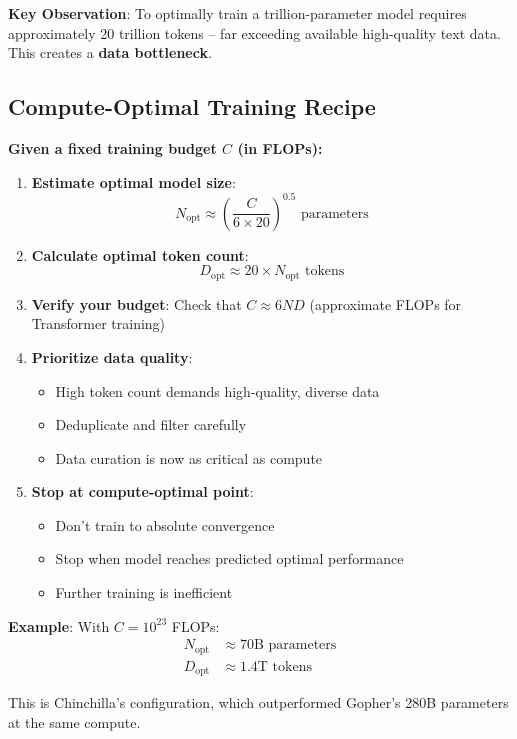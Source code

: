 \documentclass{article}
\begin{document}
\textbf{Key Observation}: To optimally train a trillion-parameter model requires approximately 20 trillion tokens -- far exceeding available high-quality text data. This creates a \textbf{data bottleneck}.

\subsection{Compute-Optimal Training Recipe}

\begin{tcolorbox}[colback=green!5!white, colframe=green!50!black, title=Practical Recipe for Compute-Optimal Training]
\textbf{Given a fixed training budget $C$ (in FLOPs):}

\begin{enumerate}
\item \textbf{Estimate optimal model size}:
\[
N_{\text{opt}} \approx \left(\frac{C}{6 \times 20}\right)^{0.5} \text{ parameters}
\]

\item \textbf{Calculate optimal token count}:
\[
D_{\text{opt}} \approx 20 \times N_{\text{opt}} \text{ tokens}
\]

\item \textbf{Verify your budget}: Check that $C \approx 6ND$ (approximate FLOPs for Transformer training)

\item \textbf{Prioritize data quality}:
\begin{itemize}
\item High token count demands high-quality, diverse data
\item Deduplicate and filter carefully
\item Data curation is now as critical as compute
\end{itemize}

\item \textbf{Stop at compute-optimal point}:
\begin{itemize}
\item Don't train to absolute convergence
\item Stop when model reaches predicted optimal performance
\item Further training is inefficient
\end{itemize}
\end{enumerate}

\textbf{Example}: With $C = 10^{23}$ FLOPs:
\begin{align*}
N_{\text{opt}} &\approx 70\text{B parameters} \\
D_{\text{opt}} &\approx 1.4\text{T tokens}
\end{align*}

This is Chinchilla's configuration, which outperformed Gopher's 280B parameters at the same compute.
\end{tcolorbox}
\end{document}
